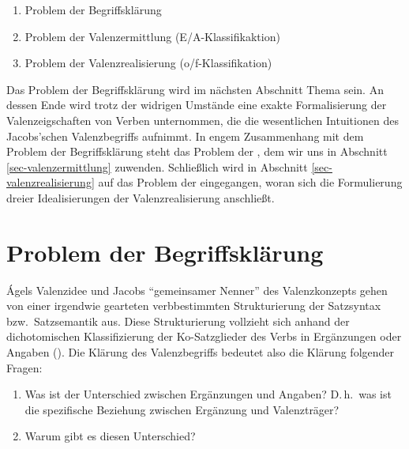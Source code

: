 \begin{enumerate}\setlength{\itemsep}{-.5ex}
  \item Problem der Begriffsklärung
  \item Problem der Valenzermittlung (E/A-Klassifikaktion)
  \item Problem der Valenzrealisierung (o/f-Klassifikation)
\end{enumerate}   
Das Problem der Begriffsklärung wird im nächsten Abschnitt Thema sein. An dessen Ende wird trotz der widrigen Umstände eine exakte Formalisierung der Valenzeigschaften von Verben unternommen, die die wesentlichen Intuitionen des Jacobs'schen Valenzbegriffs aufnimmt. In engem Zusammenhang mit dem Problem der Begriffsklärung steht das Problem der , dem wir uns in Abschnitt \ref{sec-valenzermittlung} zuwenden. Schlie\ss lich wird in Abschnitt \ref{sec-valenzrealisierung} auf das Problem der  eingegangen, woran sich die Formulierung dreier Idealisierungen der Valenzrealisierung anschließt. 





\section{Problem der Begriffsklärung} \label{sec-valenzbegriff}

\largerpage
\'Agels Valenzidee und Jacobs "`gemeinsamer Nenner"' des Valenzkonzepts gehen von einer irgendwie gearteten verbbestimmten Strukturierung der Satzsyntax bzw.\ Satzsemantik aus. Diese Strukturierung vollzieht sich anhand der dichotomischen Klassifizierung der Ko-Satzglieder des Verbs in Ergänzungen oder Angaben (). Die Klärung des Valenzbegriffs bedeutet also die Klärung folgender Fragen:

\begin{enumerate}
	\item Was ist der Unterschied zwischen Ergänzungen und Angaben? D.\,h.\ was ist die spezifische Beziehung zwischen Ergänzung und Valenzträger?
	\item Warum gibt es diesen Unterschied?   
\end{enumerate}


